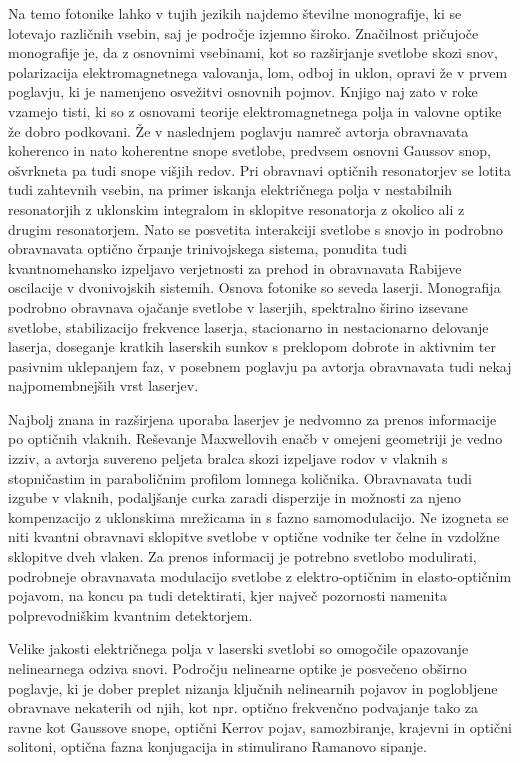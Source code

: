 \documentclass[11pt,fleqn]{book} %
\begin{document}
Na temo fotonike lahko v tujih jezikih najdemo številne monografije, ki se lotevajo različnih vsebin, saj je področje izjemno široko. Značilnost pričujoče monografije je, da z osnovnimi vsebinami, kot so razširjanje svetlobe skozi snov, polarizacija elektromagnetnega valovanja, lom, odboj in uklon, opravi že v prvem poglavju, ki je namenjeno osvežitvi osnovnih pojmov. Knjigo naj zato v roke vzamejo tisti, ki so z osnovami teorije elektromagnetnega polja in valovne optike že dobro podkovani. Že v naslednjem poglavju namreč avtorja obravnavata koherenco in nato koherentne snope svetlobe, predvsem osnovni Gaussov snop, ošvrkneta pa tudi snope višjih redov. Pri obravnavi optičnih resonatorjev se lotita tudi zahtevnih vsebin, na primer iskanja električnega polja v nestabilnih resonatorjih z uklonskim integralom in sklopitve resonatorja z okolico ali z drugim resonatorjem. Nato se posvetita interakciji svetlobe s snovjo in podrobno obravnavata optično črpanje trinivojskega sistema, ponudita tudi kvantnomehansko izpeljavo verjetnosti za prehod in obravnavata Rabijeve oscilacije v dvonivojskih sistemih. Osnova fotonike so seveda laserji. Monografija podrobno obravnava ojačanje svetlobe v laserjih, spektralno širino izsevane svetlobe, stabilizacijo frekvence laserja, stacionarno in nestacionarno delovanje laserja, doseganje kratkih laserskih sunkov s preklopom dobrote in aktivnim ter pasivnim uklepanjem faz, v posebnem poglavju pa avtorja obravnavata tudi nekaj najpomembnejših vrst laserjev.

Najbolj znana in razširjena uporaba laserjev je nedvomno za prenos informacije po optičnih vlaknih. Reševanje Maxwellovih enačb v omejeni geometriji je vedno izziv, a avtorja suvereno peljeta bralca skozi izpeljave rodov v vlaknih s stopničastim in paraboličnim profilom lomnega količnika. Obravnavata tudi izgube v vlaknih, podaljšanje curka zaradi disperzije in možnosti za njeno kompenzacijo z uklonskima mrežicama in s fazno samomodulacijo. Ne izogneta se niti kvantni obravnavi sklopitve svetlobe v optične vodnike ter čelne in vzdolžne sklopitve dveh vlaken. Za prenos informacij je potrebno svetlobo modulirati, podrobneje obravnavata modulacijo svetlobe z elektro-optičnim in elasto-optičnim pojavom, na koncu pa tudi detektirati, kjer največ pozornosti namenita polprevodniškim kvantnim detektorjem.

Velike jakosti električnega polja v laserski svetlobi so omogočile opazovanje nelinearnega odziva snovi. Področju nelinearne optike je posvečeno obširno poglavje, ki je dober preplet nizanja ključnih nelinearnih pojavov in poglobljene obravnave nekaterih od njih, kot npr. optično frekvenčno podvajanje tako za ravne kot Gaussove snope, optični Kerrov pojav, samozbiranje, krajevni in optični solitoni, optična fazna konjugacija in stimulirano Ramanovo sipanje.
\end{document}
